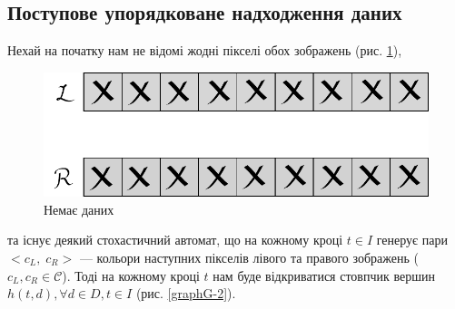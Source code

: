 \subsection{Поступове упорядковане надходження даних}
Нехай на початку нам не відомі жодні пікселі обох зображень (рис. \ref{2.1nodata}),
\begin{figure}[h!]
	\centering
	\includegraphics[scale = 0.8]{allclosed2.pdf}
	\caption{Немає даних}
	\label{2.1nodata}
\end{figure}
та існує деякий стохастичний автомат, що на кожному кроці $ t \in I $ генерує пари $<c_L, \;c_R>$ --- кольори наступних пікселів лівого та правого зображень ($ c_L, c_R \in \mathcal{C} $).
Тоді на кожному кроці $ t $ нам буде відкриватися стовпчик вершин $  h(t, d), \forall d \in D, t \in I $ (рис. \ref{graphG-2}).
